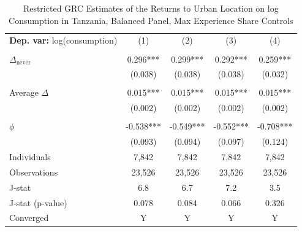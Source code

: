 \begin{table}[htbp] \centering \begin{threeparttable}
 \caption{Restricted GRC Estimates of the Returns to Urban Location on log Consumption in Tanzania, Balanced Panel, Max Experience Share Controls} 
 \label{tab:GRC_TZA_consumption_urban_bal_exp_m_sh} 
\begin{tabular}{l cccc} \toprule  \textbf{Dep. var:}  log(consumption) 
                    &\multicolumn{1}{c}{(1)}   &\multicolumn{1}{c}{(2)}   &\multicolumn{1}{c}{(3)}   &\multicolumn{1}{c}{(4)}   \\
                    &               &               &               &               \\
\addlinespace
$\Delta_{\text{never}}$&       0.296***&       0.299***&       0.292***&       0.259***\\
                    &     (0.038)   &     (0.038)   &     (0.038)   &     (0.032)   \\
                    &               &               &               &               \\
\addlinespace
Average $\Delta$    &       0.015***&       0.015***&       0.015***&       0.015***\\
                    &     (0.002)   &     (0.002)   &     (0.002)   &     (0.002)   \\
                    &               &               &               &               \\
\addlinespace
$\phi$              &      -0.538***&      -0.549***&      -0.552***&      -0.708***\\
                    &     (0.093)   &     (0.094)   &     (0.097)   &     (0.124)   \\
\addlinespace
Individuals         &       7,842   &       7,842   &       7,842   &       7,842   \\
Observations        &      23,526   &      23,526   &      23,526   &      23,526   \\
J-stat              &         6.8   &         6.7   &         7.2   &         3.5   \\
J-stat (p-value)    &       0.078   &       0.084   &       0.066   &       0.326   \\
Converged           &           Y   &           Y   &           Y   &           Y   \\

\end{tabular}
\end{threeparttable}
\end{table}
